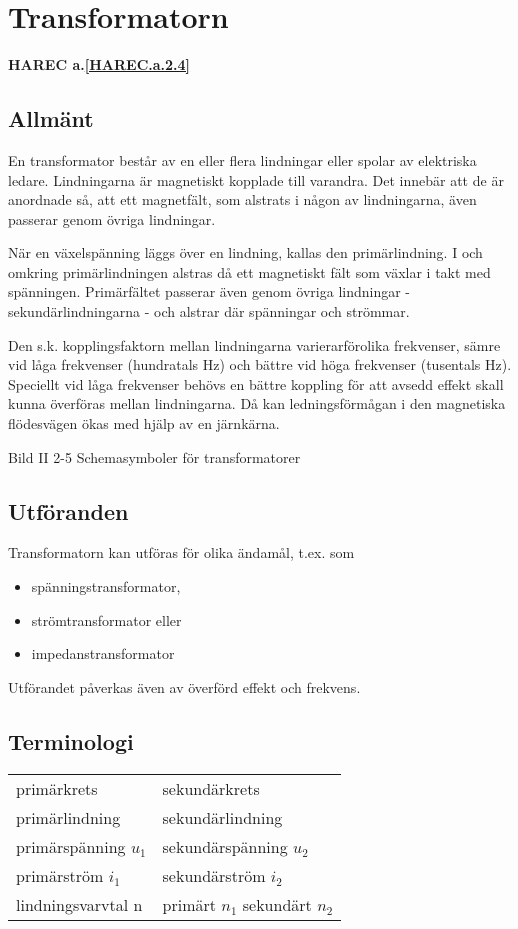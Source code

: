 \section{Transformatorn}
\textbf{HAREC a.\ref{HAREC.a.2.4}\label{myHAREC.a.2.4}}

\subsection{Allmänt}

En transformator består av en eller flera lindningar eller spolar av elektriska
ledare. Lindningarna är magnetiskt kopplade till varandra. Det innebär att de är
anordnade så, att ett magnetfält, som alstrats i någon av lindningarna, även
passerar genom övriga lindningar.

När en växelspänning läggs över en lindning, kallas den primärlindning. I och
omkring primärlindningen alstras då ett magnetiskt fält som växlar i takt med
spänningen. Primärfältet passerar även genom övriga lindningar -
sekundärlindningarna - och alstrar där spänningar och strömmar.

Den s.k. kopplingsfaktorn mellan lindningarna varierarförolika frekvenser, sämre
vid låga frekvenser (hundratals Hz) och bättre vid höga frekvenser (tusentals
Hz). Speciellt vid låga frekvenser behövs en bättre koppling för att avsedd
effekt skall kunna överföras mellan lindningarna. Då kan ledningsförmågan i den
magnetiska flödesvägen ökas med hjälp av en järnkärna.

Bild II 2-5 Schemasymboler för transformatorer

\subsection{Utföranden}

Transformatorn kan utföras för olika ändamål, t.ex. som
\begin{itemize}
\item spänningstransformator,
\item strömtransformator eller
\item impedanstransformator
\end{itemize}
Utförandet påverkas även av överförd effekt
och frekvens.

\subsection{Terminologi}

\begin{tabular}{ll}
primärkrets & sekundärkrets \\
primärlindning & sekundärlindning \\
primärspänning \(u_1\) &  sekundärspänning \(u_2\) \\
primärström \(i_1\) & sekundärström \(i_2\) \\
lindningsvarvtal n & primärt \(n_1\) sekundärt \(n_2\)
\end{tabular}

